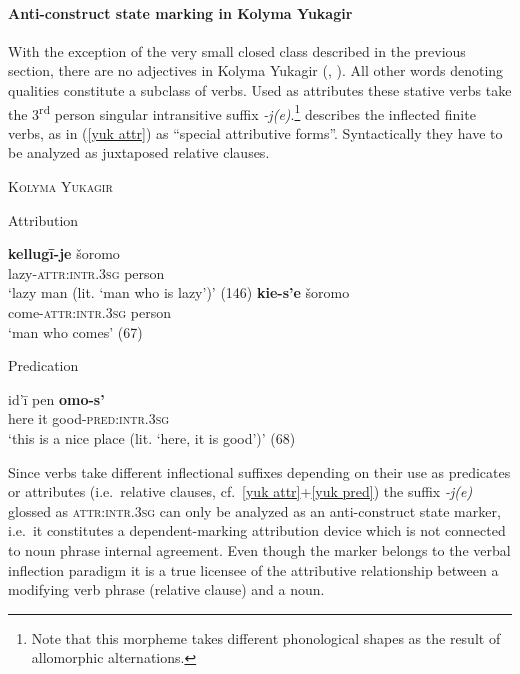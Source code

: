 \paragraph{Anti-construct state marking in Kolyma Yukagir}
With the exception of the very small closed class described in the previous section, there are no adjectives in Kolyma Yukagir (\citealt[79–112]{krejnovic1982}, \citealt[66–69, 145–147]{maslova2003b}). All other words denoting qualities constitute a subclass of verbs. Used as attributes these stative verbs take the 3\textsuperscript{rd} person singular intransitive suffix \mbox{\textit{-j(e)}}.\footnote{Note that this morpheme takes different phonological shapes as the result of allomorphic alternations.} \citet[66, elsewhere]{maslova2003b} describes the inflected finite verbs, as in (\ref{yuk attr}) as “special attributive forms”. Syntactically they have to be analyzed as juxtaposed relative clauses.
\begin{exe}
\ex 	\textsc{Kolyma Yukagir} \citep{maslova2003b}
\begin{xlist}
\ex Attribution \label{yuk attr}
\begin{xlist}
\ex
\gll 	\textbf{kellugī-je} šoromo\\
	lazy-\textsc{attr:intr.3sg} person\\
\glt	‘lazy man (lit. ‘man who is lazy’)’ (146)
\ex
\gll	\textbf{kie-s'e} šoromo\\
	come-\textsc{attr:intr.3sg} person\\
\glt	‘man who comes’ (67)
\end{xlist}
\ex \label{yuk pred} Predication
\begin{xlist}
\ex
\gll 	id'ī pen \textbf{omo-s'}\\
	here it good-\textsc{pred:intr.3sg}\\
\glt	‘this is a nice place (lit. ‘here, it is good’)’ (68)
\end{xlist}
\end{xlist}
\end{exe}
Since verbs take different inflectional suffixes depending on their use as predicates or attributes (i.e.~relative clauses, cf.~\ref{yuk attr}+\ref{yuk pred}) the suffix \textit{-j(e)} glossed as \textsc{attr:intr.3sg} can only be analyzed as an anti-construct state marker, i.e.~it constitutes a dependent-marking attribution device which is not connected to noun phrase internal agreement. Even though the marker belongs to the verbal inflection paradigm it is a true licensee of the attributive relationship between a modifying verb phrase (relative clause) and a noun.

